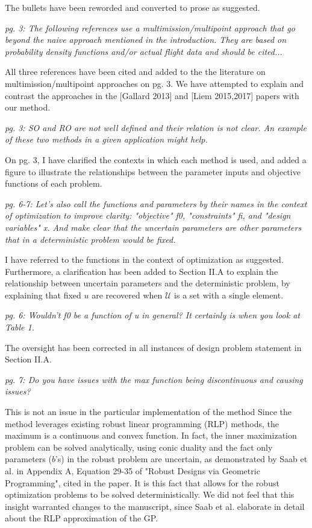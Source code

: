 \documentclass[11pt]{article}
\begin{document}
The bullets have been reworded and converted to prose as suggested. 

\textit{pg. 3: The following references use a multimission/multipoint approach that go beyond the naive approach mentioned in the introduction. They are based on probability density functions and/or actual flight data and should be cited...}

All three references have been cited and added to the the literature on multimission/multipoint approaches on pg. 3. 
We have attempted to explain and contrast the approaches in the [Gallard 2013] and [Liem 2015,2017] papers
with our method. 

\textit{pg. 3: SO and RO are not well defined and their relation is not clear. 
An example of these two methods in a given application might help.}

On pg. 3, I have  clarified the contexts in which each method is used, 
and added a figure to illustrate the relationships between the parameter inputs
and objective functions of each problem. 

\textit{pg. 6-7: Let's also call the functions and parameters by their names in the context of optimization to improve clarity: 
"objective" f0, "constraints" fi, and "design variables" x. And make clear that the uncertain parameters are other parameters that in a deterministic problem would be fixed.}

I have referred to the functions in the context of optimization as suggested. Furthermore, 
a clarification has been added to Section II.A to explain the relationship between uncertain parameters and the 
deterministic problem, by explaining that fixed $u$ are recovered when $\mathcal{U}$ is a set with a single element. 

\textit{pg. 6: Wouldn't f0 be a function of u in general? It certainly is when you look at Table 1.}

The oversight has been corrected in all instances of design problem statement in Section II.A. 

\textit{pg. 7: Do you have issues with the max function being discontinuous and causing issues?}

This is not an issue in the particular implementation of the method
Since the method leverages existing robust linear programming (RLP)
methods, the maximum is a continuous and convex function. 
In fact, the inner maximization problem can be solved analytically, using conic
duality and the fact only parameters ($b$'s) in the robust problem are uncertain, 
as demonstrated by Saab et al. in Appendix A, Equation 29-35 of "Robust Designs via Geometric Programming", 
cited in the paper.
It is this fact that allows for the robust optimization problems to be solved deterministically. 
We did not feel that this insight warranted changes to the manuscript, since 
Saab et al. elaborate in detail about the RLP approximation of the GP. 
\end{document}
